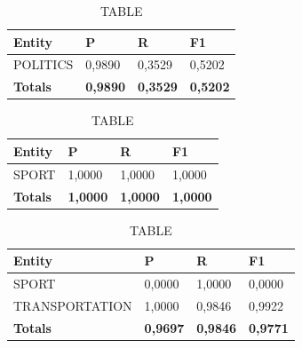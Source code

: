 \documentclass[thesis=M,english]{FITthesis}[2018/05/30]
\begin{document}
	\begin{table}[H]\centering
		\caption{TABLE}
		\label{}
		\begin{tabular}{|l|l|l|l|}
			\hline {\textbf{Entity}} & {\textbf{P}} & {\textbf{R}} & {\textbf{F1}}\\\hline
				POLITICS & 0,9890 & 0,3529 & 0,5202\\\hline
				\textbf{Totals} & \textbf{0,9890} & \textbf{0,3529} & \textbf{0,5202}\\\hline
		\end{tabular}
	\end{table}

	\begin{table}[H]\centering
		\caption{TABLE}
		\label{}
		\begin{tabular}{|l|l|l|l|}
			\hline {\textbf{Entity}} & {\textbf{P}} & {\textbf{R}} & {\textbf{F1}}\\\hline
				SPORT & 1,0000 & 1,0000 & 1,0000\\\hline
				\textbf{Totals} & \textbf{1,0000} & \textbf{1,0000} & \textbf{1,0000}\\\hline
		\end{tabular}
	\end{table}	

	\begin{table}[H]\centering
		\caption{TABLE}
		\label{}
		\begin{tabular}{|l|l|l|l|}
			\hline {\textbf{Entity}} & {\textbf{P}} & {\textbf{R}} & {\textbf{F1}}\\\hline
				SPORT & 0,0000 & 1,0000 & 0,0000\\
				TRANSPORTATION & 1,0000 & 0,9846 & 0,9922\\\hline
				\textbf{Totals} & \textbf{0,9697} & \textbf{0,9846} & \textbf{0,9771}\\\hline
		\end{tabular}
	\end{table}	
		
	
\end{document}
